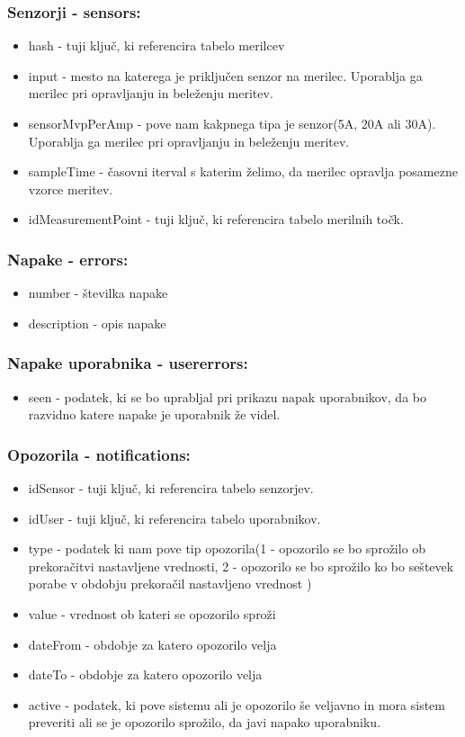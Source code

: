 \documentclass[12pt,a4paper,titlepage,openany]{report}
\begin{document}
\subsubsection{Senzorji - sensors:}
\begin{itemize}
\item hash - tuji ključ, ki referencira tabelo merilcev
\item input - mesto na katerega je priključen senzor na merilec. Uporablja ga merilec pri opravljanju in beleženju meritev.
\item sensorMvpPerAmp - pove nam kakpnega tipa je senzor(5A, 20A ali 30A). Uporablja ga merilec pri opravljanju in beleženju meritev.
\item sampleTime - časovni iterval s katerim želimo, da merilec opravlja posamezne vzorce meritev.
\item idMeasurementPoint - tuji ključ, ki referencira tabelo merilnih točk.
\end{itemize}

\subsubsection{Napake - errors:}
\begin{itemize}
\item number - številka napake
\item description - opis napake
\end{itemize}

\subsubsection{Napake uporabnika - usererrors:}
\begin{itemize}
\item seen - podatek, ki se bo uprabljal pri prikazu napak uporabnikov, da bo razvidno katere napake je uporabnik že videl.
\end{itemize}


\subsubsection{Opozorila - notifications:}
\begin{itemize}
\item idSensor -  tuji ključ, ki referencira tabelo senzorjev.
\item idUser -  tuji ključ, ki referencira tabelo uporabnikov.
\item type - podatek ki nam pove tip opozorila(1 - opozorilo se bo sprožilo ob prekoračitvi nastavljene vrednosti, 2 - opozorilo se bo sprožilo ko bo seštevek porabe v obdobju prekoračil nastavljeno vrednost )
\item value - vrednost ob kateri se opozorilo sproži
\item dateFrom - obdobje za katero opozorilo velja
\item dateTo - obdobje za katero opozorilo velja
\item active - podatek, ki pove sistemu ali je opozorilo še veljavno in mora sistem preveriti ali se je opozorilo sprožilo, da javi napako uporabniku.
\end{itemize}
\end{document}
